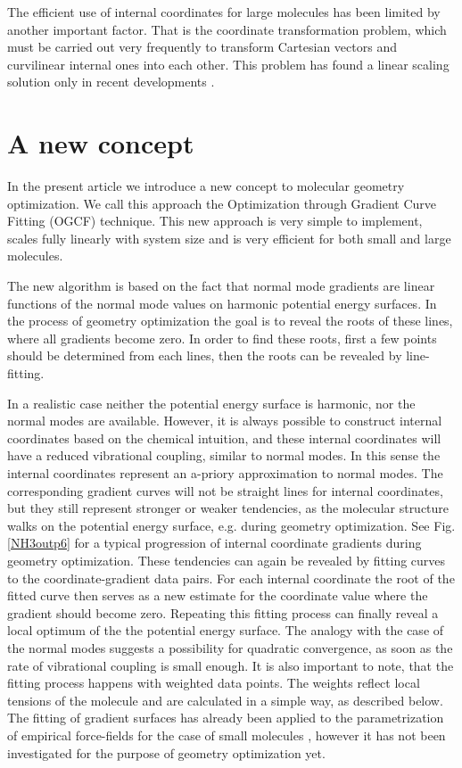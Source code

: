 \documentclass[prl,aps,twocolumn,showpacs,twocolumngrid,superbib]{revtex4}
\begin{document}
The efficient use of internal coordinates for large molecules has 
been limited by another important factor. That is the coordinate
transformation problem, which must be carried out very frequently
to transform Cartesian vectors and curvilinear internal ones into each
other. This problem has found a linear scaling solution   
only in recent developments 
\cite{paizs_coordtrf1,nemeth_coordtrf1,paizs_coordtrf2,nemeth_coordtrf2,billeter_coordtrf,andzelm_coordtrf,kudin_coordtrf}. 


\section{A new concept}
In the present article we introduce a new concept 
to molecular geometry optimization. We call this approach the
Optimization through Gradient Curve Fitting (OGCF) technique. 
This new approach is very simple
to implement, scales fully linearly with system size 
and is very efficient for both small and large molecules.

The new algorithm is based on the fact that
normal mode gradients are linear functions of the normal mode values 
on harmonic potential energy surfaces. 
In the process of geometry optimization the goal is to reveal the roots
of these lines, where all gradients become zero. In order to 
find these roots, first a few points should be determined from each
lines, then the roots can be revealed by line-fitting. 

In a realistic case neither the potential energy surface is 
harmonic, nor the normal modes are available. However, it is always
possible to construct internal coordinates based on the chemical
intuition, and these internal coordinates will have a reduced
vibrational coupling, similar to normal modes. 
In this sense the internal coordinates represent an a-priory
approximation to normal modes.
The corresponding
gradient curves will not be straight lines for internal coordinates,
but they still represent stronger or weaker tendencies, as the molecular
structure walks on the potential energy surface, e.g. during geometry
optimization. 
See Fig. \ref{NH3outp6} for a typical progression of internal
coordinate gradients during geometry optimization.
These tendencies can again be revealed by fitting curves to the
coordinate-gradient data pairs. For each internal coordinate 
the root of the fitted curve then 
serves as a new estimate for the coordinate value where the gradient
should become zero. Repeating this fitting process can finally
reveal a local optimum of the the potential energy surface.
The analogy with the case of the normal modes suggests a possibility
for quadratic convergence, as soon as the rate of vibrational
coupling is small enough.
It is also important to note, that the fitting process happens
with weighted data points. The weights reflect local tensions
of the molecule and are calculated in a simple way, as described below.
The fitting of gradient surfaces has already been applied to 
the parametrization of empirical
force-fields for the case of small molecules
\cite{force-field-fitting,force-matching}, however it 
has not been investigated for the purpose of geometry optimization yet.
\end{document}
